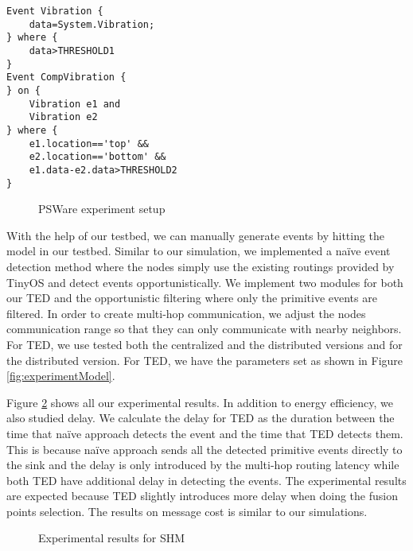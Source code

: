\begin{lstlisting}[caption=Event definition for SHM, label=lst:shm]
Event Vibration {
	data=System.Vibration;
} where {
	data>THRESHOLD1
}
Event CompVibration {
} on {
	Vibration e1 and
	Vibration e2
} where {
	e1.location=='top' &&
	e2.location=='bottom' &&
	e1.data-e2.data>THRESHOLD2
}
\end{lstlisting}

\begin{figure}
\centering
{}
\caption{PSWare experiment setup}
\label{fig:experimentSetup}
\end{figure}

With the help of our testbed, we can manually generate events by hitting the model in our testbed. Similar to our simulation, we implemented a na\"{i}ve event detection method where the nodes simply use the existing routings provided by TinyOS \cite{nesc} and detect events opportunistically. We implement two modules for both our TED and the opportunistic filtering where only the primitive events are filtered. In order to create multi-hop communication, we adjust the nodes communication range so that they can only communicate with nearby neighbors. For TED, we use tested both the centralized and the distributed versions and for the distributed version. For TED, we have the parameters set as shown in Figure \ref{fig:experimentModel}.

Figure \ref{fig:exp-all} shows all our experimental results. In addition to energy efficiency, we also studied delay. We calculate the delay for TED as the duration between the time that na\"{i}ve approach detects the event and the time that TED detects them. This is because na\"{i}ve approach sends all the detected primitive events directly to the sink and the delay is only introduced by the multi-hop routing latency while both TED have additional delay in detecting the events. The experimental results are expected because TED slightly introduces more delay when doing the fusion points selection. The results on message cost is similar to our simulations.

\begin{figure}
\centering
{}
\caption{Experimental results for SHM}
\label{fig:exp-all}
\end{figure}
